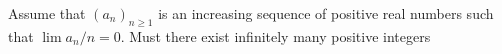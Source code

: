 Assume that $(a_n)_{n\geq 1}$ is an increasing sequence of
positive real numbers such that
$\lim a_n/n=0$.  Must there exist infinitely many positive integers
